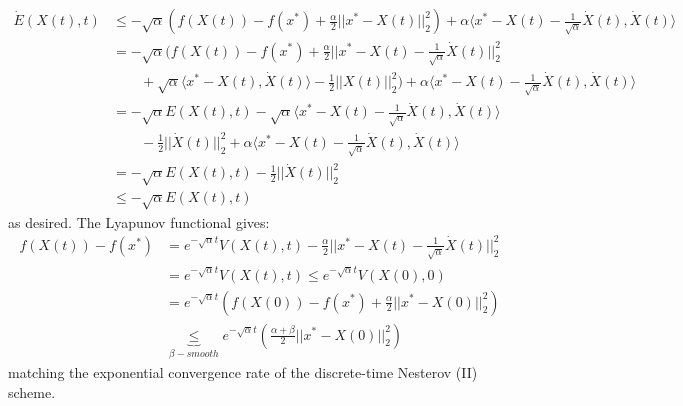 \begin{align*}
    \dot{E}(X(t), t) &\leq -\sqrt{\alpha} ( f(X(t)) - f(x^*) + \frac{\alpha}{2} ||x^*-X(t)||_2^2) + \alpha \langle x^*-X(t)-\frac{1}{\sqrt{\alpha}} \dot{X}(t), \dot{X}(t) \rangle\\ 
    &= -\sqrt{\alpha} ( f(X(t)) - f(x^*) + \frac{\alpha}{2} ||x^*-X(t)-\frac{1}{\sqrt{\alpha}} \dot{X}(t) ||_2^2 \\
    &\qquad +\sqrt{\alpha} \langle x^*-X(t), \dot{X}(t) \rangle -\frac{1}{2} ||X(t)||_2^2)  + \alpha \langle x^*-X(t)-\frac{1}{\sqrt{\alpha}} \dot{X}(t), \dot{X}(t) \rangle \\
    & = -\sqrt{\alpha} E(X(t), t) - \sqrt{\alpha} \langle x^*-X(t)-\frac{1}{\sqrt{\alpha}} \dot{X}(t), \dot{X}(t) \rangle\\ & \qquad-\frac{1}{2} ||\dot{X}(t)||_2^2 + \alpha \langle x^*-X(t)-\frac{1}{\sqrt{\alpha}} \dot{X}(t), \dot{X}(t) \rangle \\
    & = -\sqrt{\alpha} E(X(t), t) - \frac{1}{2} ||\dot{X}(t)||_2^2 \\
    & \leq -\sqrt{\alpha} E(X(t), t)
\end{align*}
as desired. The Lyapunov functional gives:
\begin{align*}
    f(X(t)) - f(x^*) &= e^{-\sqrt{\alpha}t} V(X(t), t) - \frac{\alpha}{2} ||x^*-X(t)-\frac{1}{\sqrt{\alpha}} \dot{X}(t)||_2^2 \\
    & = e^{-\sqrt{\alpha}t} V(X(t), t) \leq e^{-\sqrt{\alpha}t} V(X(0), 0)  \\
    & = e^{-\sqrt{\alpha}t} \left(f(X(0))-f(x^*)+\frac{\alpha}{2}||x^*-X(0)||_2^2 \right) \\
    & \underbrace{\leq}_{\beta-smooth} e^{-\sqrt{\alpha}t} \left(\frac{\alpha+\beta}{2}||x^*-X(0)||_2^2 \right)
\end{align*}
matching the exponential convergence rate of the discrete-time Nesterov (II) scheme.
\proofend 
 

